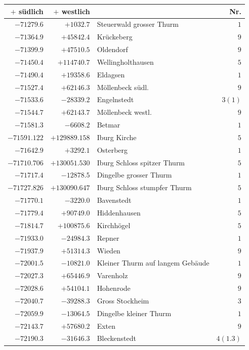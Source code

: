 \begin{center}\begingroup\fontsize{8}{9}\selectfont
\setlength{\tabcolsep}{4pt}
\begin{tabular}{r|r|p{170pt}|r}\hline
\(+\) südlich&\(+\) westlich&&Nr.\\\hline
\(-71279.6\)&\(+1032.7\)&Steuerwald grosser Thurm&\(1\)\\
\(-71364.9\)&\(+45842.4\)&Krückeberg&\(9\)\\
\(-71399.9\)&\(+47510.5\)&Oldendorf&\(9\)\\
\(-71450.4\)&\(+114740.7\)&Wellingholthausen&\(5\)\\
\(-71490.4\)&\(+19358.6\)&Eldagsen&\(1\)\\
\(-71527.4\)&\(+62146.3\)&Möllenbeck südl.&\(9\)\\
\(-71533.6\)&\(-28339.2\)&Engelnstedt&\(3 (1)\)\\
\(-71544.7\)&\(+62143.7\)&Möllenbeck westl.&\(9\)\\
\(-71581.3\)&\(-6608.2\)&Betmar&\(1\)\\
\(-71591.122\)&\(+129889.158\)&Iburg Kirche&\(5\)\\
\(-71642.9\)&\(+3292.1\)&Osterberg&\(1\)\\
\(-71710.706\)&\(+130051.530\)&Iburg Schloss spitzer Thurm&\(5\)\\
\(-71717.4\)&\(-12878.5\)&Dingelbe grosser Thurm&\(1\)\\
\(-71727.826\)&\(+130090.647\)&Iburg Schloss stumpfer Thurm&\(5\)\\
\(-71770.1\)&\(-3220.0\)&Bavenstedt&\(1\)\\
\(-71779.4\)&\(+90749.0\)&Hiddenhausen&\(5\)\\
\(-71814.7\)&\(+100875.6\)&Kirchhögel&\(5\)\\
\(-71933.0\)&\(-24984.3\)&Repner&\(1\)\\
\(-71937.9\)&\(+51314.3\)&Wieden&\(9\)\\
\(-72001.5\)&\(-10821.0\)&Kleiner Thurm auf langem Gebäude&\(1\)\\
\(-72027.3\)&\(+65446.9\)&Varenholz&\(9\)\\
\(-72028.6\)&\(+54104.1\)&Hohenrode&\(9\)\\
\(-72040.7\)&\(-39288.3\)&Gross Stockheim&\(3\)\\
\(-72059.9\)&\(-13064.5\)&Dingelbe kleiner Thurm&\(1\)\\
\(-72143.7\)&\(+57680.2\)&Exten&\(9\)\\
\(-72190.3\)&\(-31646.3\)&Bleckenstedt&\(4(1.3)\)\\

\end{tabular}
\end{center}
